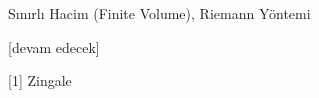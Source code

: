 \documentclass[12pt,fleqn]{article}\usepackage{../../common}
\begin{document}
Sınırlı Hacim (Finite Volume), Riemann Yöntemi







[devam edecek]

[1] Zingale
\end{document}
